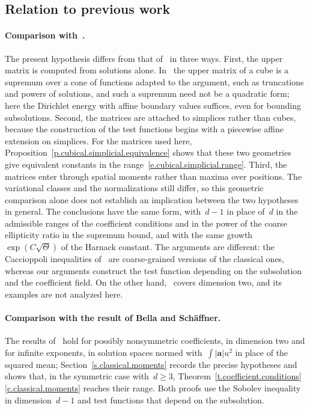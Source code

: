 \documentclass[11pt,letterpaper]{article}
\numberwithin{equation}{section}
\theoremstyle{definition}
\renewcommand{\a}{\mathbf{a}}
\begin{document}
\subsection{Relation to previous work}
\label{ss.intro.discussion}

\paragraph{Comparison with~\cite{AADKM}.} The present hypothesis differs from that of~\cite{AADKM} in three ways. First, the upper matrix is computed from solutions alone. In~\cite{AADKM} the upper matrix of a cube is a supremum over a cone of functions adapted to the argument, such as truncations and powers of solutions, and such a supremum need not be a quadratic form; here the Dirichlet energy with affine boundary values suffices, even for bounding subsolutions. Second, the matrices are attached to simplices rather than cubes, because the construction of the test functions begins with a piecewise affine extension on simplices. For the matrices used here, Proposition~\ref{p.cubical.simplicial.equivalence} shows that these two geometries give equivalent constants in the range~\eqref{e.cubical.simplicial.range}. Third, the matrices enter through spatial moments rather than maxima over positions. The variational classes and the normalizations still differ, so this geometric comparison alone does not establish an implication between the two hypotheses in general. The conclusions have the same form, with~$d-1$ in place of~$d$ in the admissible ranges of the coefficient conditions and in the power of the coarse ellipticity ratio in the supremum bound, and with the same growth~$\exp(C\sqrt\Theta)$ of the Harnack constant. The arguments are different: the Caccioppoli inequalities of~\cite{AADKM} are coarse-grained versions of the classical ones, whereas our arguments construct the test function depending on the subsolution and the coefficient field. On the other hand,~\cite{AADKM} covers dimension two, and its examples are not analyzed here.

\paragraph{Comparison with the result of Bella and Sch\"affner.} The results of~\cite{Bella.Schaffner.regularity} hold for possibly nonsymmetric coefficients, in dimension two and for infinite exponents, in solution spaces normed with~$\int|\a|u^2$ in place of the squared mean; Section~\ref{s.classical.moments} records the precise hypotheses and shows that, in the symmetric case with~$d\geq3$, Theorem~\ref{t.coefficient.conditions}\ref{c.classical.moments} reaches their range. Both proofs use the Sobolev inequality in dimension~$d-1$
and test functions that depend on the subsolution.
\end{document}
